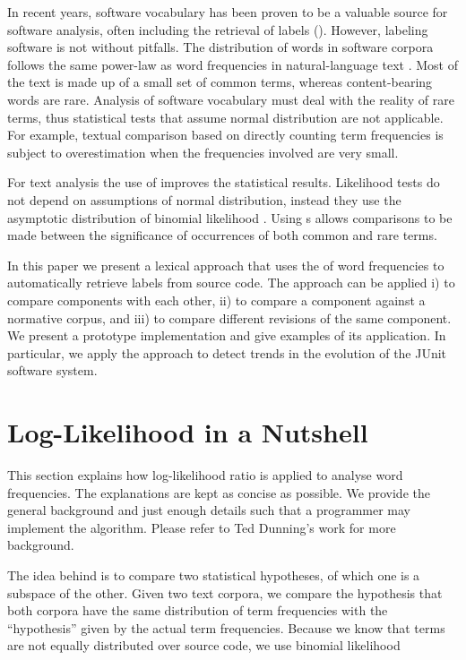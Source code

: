 \documentclass[10pt]{book}
\begin{document}
In recent years, software vocabulary has been proven to be a valuable source for software analysis, often including the retrieval of labels (\eg \cite{Baldi08OOPSLA,EinarHoest,Kuhn07a}). However, labeling software is not without pitfalls. The distribution of words in software corpora follows the same power-law as word frequencies in natural-language text \cite{Linstead09SUITE}. Most of the text is made up of a small set of common terms, whereas content-bearing words are rare. Analysis of software vocabulary must deal with the reality of rare terms, thus statistical tests that assume normal distribution are not applicable. For example, textual comparison based on directly counting term frequencies is subject to overestimation when the frequencies involved are very small.  

For text analysis the use of \loglr improves the statistical results. Likelihood tests do not depend on assumptions of normal distribution, instead they use the asymptotic distribution of binomial likelihood \cite{Dunning}. Using \loglr{}s allows comparisons to be made between the significance of occurrences of both common and rare terms.

In this paper we present a lexical approach that uses the \loglr of word frequencies to automatically retrieve labels from source code. The approach can be applied i) to compare components with each other, ii) to compare a component against a normative corpus, and iii) to compare different revisions of the same component. We present a prototype implementation and give examples of its application. In particular, we apply the approach to detect trends in the evolution of the JUnit software system.

\section{Log-Likelihood in a Nutshell}\label{nutshell}

This section explains how log-likelihood ratio is applied to analyse word frequencies. The explanations are kept as concise as possible. We provide the general background and just enough details such that a programmer may implement the algorithm. Please refer to Ted Dunning's work \cite{Dunning} for more background.

The idea behind \loglr is to compare two statistical hypotheses, of which one is a subspace of the other. Given two text corpora, we compare the hypothesis that both corpora have the same distribution of term frequencies with the ``hypothesis'' given by the actual term frequencies. Because we know that terms are not equally distributed over source code, we use binomial likelihood
\end{document}
